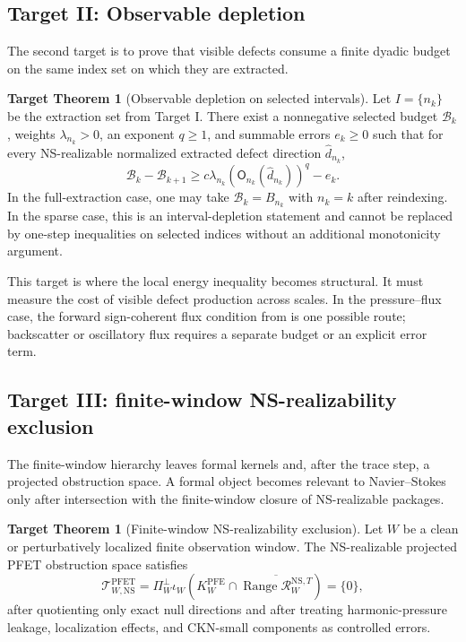 \documentclass[11pt]{article}
\numberwithin{equation}{section}
\theoremstyle{plain}
\theoremstyle{definition}
\newtheorem{target}[theorem]{Target Theorem}
\theoremstyle{remark}
\newcommand{\NS}{\mathrm{NS}}
\newcommand{\PFE}{\mathrm{PFE}}
\newcommand{\PFET}{\mathrm{PFET}}
\begin{document}
\subsection{Target II: Observable depletion}

The second target is to prove that visible defects consume a finite dyadic
budget on the same index set on which they are extracted.

\begin{target}[Observable depletion on selected intervals]
\label{thm:target-observable-depletion}
Let \(I=\{n_k\}\) be the extraction set from Target I.  There exist a
nonnegative selected budget \(\mathscr B_k\), weights \(\lambda_{n_k}>0\), an
exponent \(q\ge1\), and summable errors \(e_k\ge0\) such that for every
NS-realizable normalized extracted defect direction \(\widehat d_{n_k}\),
\[
        \mathscr B_k-\mathscr B_{k+1}
        \ge
        c\lambda_{n_k}
        \left(\mathsf O_{n_k}(\widehat d_{n_k})\right)^q
        -e_k.
\]
In the full-extraction case, one may take \(\mathscr B_k=B_{n_k}\) with
\(n_k=k\) after reindexing.  In the sparse case, this is an interval-depletion
statement and cannot be replaced by one-step inequalities on selected indices
without an additional monotonicity argument.
\end{target}

This target is where the local energy inequality becomes structural.  It must
measure the cost of visible defect production across scales.  In the
pressure--flux case, the forward sign-coherent flux condition from
 is one possible route; backscatter or oscillatory
flux requires a separate budget or an explicit error term.

\subsection{Target III: finite-window NS-realizability exclusion}

The finite-window hierarchy leaves formal kernels and, after the trace step, a
projected obstruction space.  A formal object becomes relevant to
Navier--Stokes only after intersection with the finite-window closure of
NS-realizable packages.

\begin{target}[Finite-window NS-realizability exclusion]
\label{thm:target-NS-realizability-exclusion}
Let \(W\) be a clean or perturbatively localized finite observation window.  The
NS-realizable projected PFET obstruction space satisfies
\[
        \mathcal T_{W,\NS}^{\PFET}
        =
        \Pi_W^\perp\iota_W
        \left(
          K_W^{\PFE}
          \cap
          \overline{\operatorname{Range}\mathcal R_W^{\NS,T}}
        \right)
        =\{0\},
\]
after quotienting only exact null directions and after treating harmonic-pressure leakage, localization effects, and CKN-small components as controlled errors.
\end{target}
\end{document}
